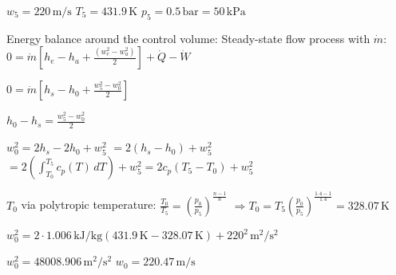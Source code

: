 \( w_5 = 220 \, \text{m/s} \)  
\( T_5 = 431.9 \, \text{K} \)  
\( p_5 = 0.5 \, \text{bar} = 50 \, \text{kPa} \)  

Energy balance around the control volume: Steady-state flow process with \( \dot{m} \):  
\( 0 = \dot{m} [h_e - h_a + \frac{(w_e^2 - w_a^2)}{2}] + \dot{Q} - \dot{W} \)  

\( 0 = \dot{m} [h_s - h_0 + \frac{w_5^2 - w_0^2}{2}] \)  

\( h_0 - h_s = \frac{w_5^2 - w_0^2}{2} \)  

\( w_0^2 = 2 h_s - 2 h_0 + w_5^2 \)  
\( = 2 (h_s - h_0) + w_5^2 \)  
\( = 2 \left( \int_{T_0}^{T_5} c_p(T) \, dT \right) + w_5^2 = 2 c_p (T_5 - T_0) + w_5^2 \)  

\( T_0 \) via polytropic temperature:  
\( \frac{T_0}{T_5} = \left( \frac{p_0}{p_5} \right)^{\frac{n-1}{n}} \)  
\( \Rightarrow T_0 = T_5 \left( \frac{p_0}{p_5} \right)^{\frac{1.4 - 1}{1.4}} = 328.07 \, \text{K} \)  

\( w_0^2 = 2 \cdot 1.006 \, \text{kJ/kg} (431.9 \, \text{K} - 328.07 \, \text{K}) + 220^2 \, \text{m}^2/\text{s}^2 \)  

\( w_0^2 = 48008.906 \, \text{m}^2/\text{s}^2 \)  
\( w_0 = 220.47 \, \text{m/s} \)